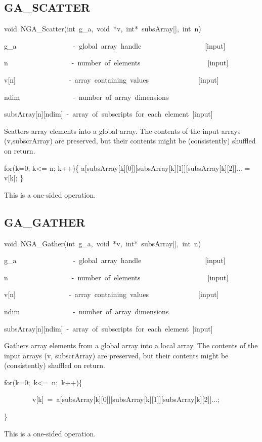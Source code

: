 \subsection*{\label{sub:GA_SCATTER}GA\_SCATTER}
\begin{lyxcode}
void~NGA\_Scatter(int~g\_a,~void~{*}v,~int{*}~subsArray{[}{]},~int~n)



g\_a~~~~~~~~~~~~~~~~-~global~array~handle~~~~~~~~~~~~~~~~~~{[}input{]}

n~~~~~~~~~~~~~~~~~~-~number~of~elements~~~~~~~~~~~~~~~~~~~{[}input{]}

v{[}n{]}~~~~~~~~~~~~~~~-~array~containing~values~~~~~~~~~~~~~~{[}input{]}~

ndim~~~~~~~~~~~~~~~-~number~of~array~dimensions

subsArray{[}n{]}{[}ndim{]}~-~array~of~subscripts~for~each~element~{[}input{]}
\end{lyxcode}
Scatters array elements into a global array. The contents of the input
arrays (v,subscrArray) are preserved, but their contents might be
(consistently) shuffled on return.

for(k=0; k<= n; k++)\{ a{[}subsArray{[}k{]}{[}0{]}{]}{[}subsArray{[}k{]}{[}1{]}{]}{[}subsArray{[}k{]}{[}2{]}{]}...
= v{[}k{]}; \}

This is a one-sided operation.


\subsection*{\label{sub:GA_GATHER}GA\_GATHER}
\begin{lyxcode}
void~NGA\_Gather(int~g\_a,~void~{*}v,~int{*}~subsArray{[}{]},~int~n)



g\_a~~~~~~~~~~~~~~~~-~global~array~handle~~~~~~~~~~~~~~~~~~{[}input{]}~

n~~~~~~~~~~~~~~~~~~-~number~of~elements~~~~~~~~~~~~~~~~~~~{[}input{]}~

v{[}n{]}~~~~~~~~~~~~~~~-~array~containing~values~~~~~~~~~~~~~~{[}input{]}

ndim~~~~~~~~~~~~~~~-~number~of~array~dimensions~

subsArray{[}n{]}{[}ndim{]}~-~array~of~subscripts~for~each~element~{[}input{]}
\end{lyxcode}
Gathers array elements from a global array into a local array. The
contents of the input arrays (v, subscrArray) are preserved, but their
contents might be (consistently) shuffled on return.
\begin{lyxcode}
for(k=0;~k<=~n;~k++)\{

~~~~~~~~v{[}k{]}~=~a{[}subsArray{[}k{]}{[}0{]}{]}{[}subsArray{[}k{]}{[}1{]}{]}{[}subsArray{[}k{]}{[}2{]}{]}...;~

\}
\end{lyxcode}
This is a one-sided operation. 


